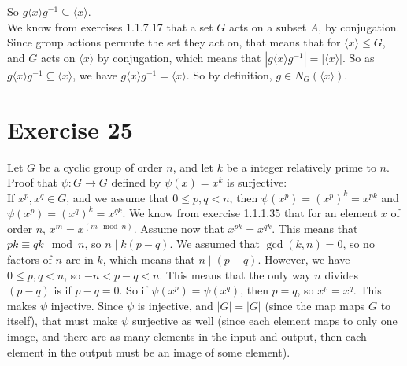 \documentclass[12pt]{article}
\begin{document}
\begin{enumerate}[label=\textbf{\alph*.}]
            So $g\langle x \rangle g^{-1} \subseteq \langle x \rangle$. \\
            We know from exercises 1.1.7.17
            that a set $G$ acts on a subset $A$,
            by conjugation.
            Since group actions permute the set they act on,
            that means that for $\langle x \rangle \leqslant G$,
            and $G$ acts on $\langle x \rangle$ by conjugation,
            which means that
            $|g\langle x \rangle g^{-1}| = |\langle x \rangle|$.
            So as $g\langle x \rangle g^{-1} \subseteq \langle x \rangle$,
            we have $g\langle x \rangle g^{-1} = \langle x \rangle$.
            So by definition, $g \in N_G(\langle x \rangle)$.
    \end{enumerate}


    \section*{Exercise 25}
    Let $G$ be a cyclic group of order $n$,
    and let $k$ be a integer relatively prime to $n$.
    Proof that $\psi: G \to G$ defined by $\psi(x) = x^k$ is surjective: \\
    If $x^p, x^q \in G$,
    and we assume that $0 \leqslant p, q < n$,
    then $\psi(x^p) = (x^p)^k = x^{pk}$
    and $\psi(x^p) = (x^q)^k = x^{qk}$.
    We know from exercise 1.1.1.35 that for an element $x$ of order $n$,
    $x^m = x^{(m \mod n)}$.
    Assume now that $x^{pk} = x^{qk}$.
    This means that $pk \equiv qk \mod n$,
    so $n \mid k(p - q)$.
    We assumed that $\gcd(k, n) = 0$,
    so no factors of $n$ are in $k$,
    which means that $n \mid (p - q)$.
    However, we have $0 \leqslant p, q < n$, 
    so $-n < p - q < n$.
    This means that the only way $n$ divides $(p - q)$
    is if $p - q = 0$.
    So if $\psi(x^p) = \psi(x^q)$,
    then $p = q$, 
    so $x^p = x^q$.
    This makes $\psi$ injective.
    Since $\psi$ is injective,
    and $|G| = |G|$ (since the map maps $G$ to itself),
    that must make $\psi$ surjective as well
    (since each element maps to only one image,
    and there are as many elements in the input and output,
    then each element in the output must be an image of some element).
\end{document}
